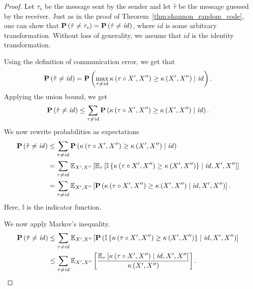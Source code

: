 \begin{proof}
Let $\tau_s$ be the message sent by the sender and let $\hat{\tau}$ be the message guessed by the receiver. Just as in the proof of Theorem~\ref{thm:shannon_random_code}, one can show that $\mathbf{P}\left(\hat{\tau} \neq \tau_s\right) = \mathbf{P}\left(\hat{\tau} \neq \mathit{id}\right)$, where $\mathit{id}$ is some arbitrary transformation. Without loss of generality, we assume that $\mathit{id}$ is the identity transformation.

Using the definition of communication error, we get that
%
$$\mathbf{P}\left(\hat{\tau} \neq \mathit{id}\right) = \mathbf{P}\left(\max_{\tau \neq \mathit{id}} \kappa\left(\tau\circ X', X''\right) \geq \kappa\left(X', X''\right) \mid \mathit{id}\right).$$
%
Applying the union bound, we get
%
$$\mathbf{P}\left(\hat{\tau} \neq \mathit{id}\right) \leq \sum_{\tau \neq \mathit{id}}\mathbf{P}\left(\kappa\left(\tau\circ X', X''\right) \geq \kappa\left(X', X''\right) \mid \mathit{id}\right).$$
%
We now rewrite probabilities as expectations
%
\begin{align*}
\mathbf{P}\left(\hat{\tau} \neq \mathit{id}\right) &\leq \sum_{\tau \neq \mathit{id}}\mathbf{P}\left(\kappa\left(\tau\circ X', X''\right) \geq \kappa\left(X', X''\right) \mid \mathit{id}\right)\\
&= \sum_{\tau \neq \mathit{id}}\mathbb{E}_{X', X''}\left[\mathbb{E}_{\tau}\left[\mathbb{I}\left\{\kappa\left(\tau\circ X', X''\right) \geq \kappa\left(X', X''\right)\right\} \mid \mathit{id}, X', X''\right]\right]\\
&= \sum_{\tau \neq \mathit{id}}\mathbb{E}_{X', X''}\left[\mathbf{P}\left(\kappa\left(\tau\circ X', X''\right) \geq \kappa\left(X', X''\right) \mid \mathit{id}, X', X''\right)\right].
\end{align*}
%
Here, $\mathbb{I}$ is the indicator function.

We now apply Markov's inequality.
%
\begin{align*}
\mathbf{P}\left(\hat{\tau} \neq \mathit{id}\right) &\leq \sum_{\tau \neq \mathit{id}}\mathbb{E}_{X', X''}\left[\mathbf{P}\left(\mathbb{I}\left\{\kappa\left(\tau\circ X', X''\right) \geq \kappa\left(X', X''\right)\right\} \mid \mathit{id}, X', X''\right)\right]\\
&\leq \sum_{\tau \neq \mathit{id}}\mathbb{E}_{X', X''}\left[\frac{\mathbb{E}_\tau\left[\kappa\left(\tau \circ X', X''\right) \mid \mathit{id}, X', X'' \right]}{\kappa\left(X', X''\right)}\right].
\end{align*}
%


\end{proof}
